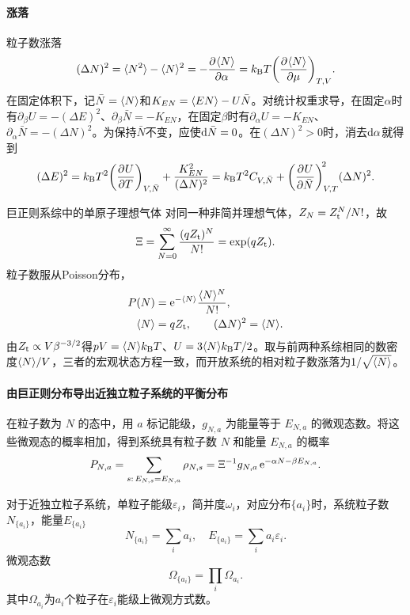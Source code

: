\paragraph{涨落}
粒子数涨落
\begin{align}
	(\Delta N)^2 = \langle N^2\rangle - \langle N\rangle^2 = -\frac{\partial^{}\langle N\rangle}{\partial{\alpha}^{}} = k_{\mathrm{B}} T\biggl(\frac{\partial^{}\langle N\rangle}{\partial{\mu}^{}}\biggr)_{T,V}.
\end{align}
在固定体积下，记$\bar N = \langle N\rangle$和$K_{EN} = \langle EN\rangle - U\bar N$。对统计权重求导，在固定$\alpha$时有$\partial_\beta U = -(\Delta E)^2$、$\partial_\beta\bar N = -K_{EN}$，在固定$\beta$时有$\partial_\alpha U = -K_{EN}$、$\partial_\alpha\bar N = -(\Delta N)^2$。为保持$\bar N$不变，应使$\mathop{}\!\mathrm{d}\bar N = 0$。在$(\Delta N)^2 > 0$时，消去$\mathop{}\!\mathrm{d}\alpha$就得到
\begin{align}
	(\Delta E)^2 = k_{\mathrm{B}} T^2\biggl(\frac{\partial^{}U}{\partial{T}^{}}\biggr)_{V,\bar N}
	+ \frac{K_{EN}^2}{(\Delta N)^2}
	= k_{\mathrm{B}} T^2 C_{V,\bar N} + \biggl(\frac{\partial^{}U}{\partial{\bar N}^{}}\biggr)_{V,T}^{\!2}(\Delta N)^2 .
\end{align}
\begin{example}{巨正则系综中的单原子理想气体}{}
	对同一种非简并理想气体，$Z_N = Z_\mathrm t^N/N!$，故
	\[
		\Xi = \sum_{N=0}^{\infty}\frac{(qZ_\mathrm t)^N}{N!} = \exp(qZ_\mathrm t).
	\]
	粒子数服从Poisson分布，
	\begin{subequations}
		\label{eq:sm-grand-canonical-poisson}
		\begin{align}
			P(N) &= \mathop{}\!\mathrm{e}^{-\langle N\rangle}\frac{\langle N\rangle^N}{N!},\\
			\langle N\rangle &= qZ_\mathrm t,\qquad (\Delta N)^2 = \langle N\rangle.
		\end{align}
	\end{subequations}
	由$Z_\mathrm t \propto V\beta^{-3/2}$得$pV = \langle N\rangle k_{\mathrm{B}} T$、$U = 3\langle N\rangle k_{\mathrm{B}} T/2$。取与前两种系综相同的数密度$\langle N\rangle/V$，三者的宏观状态方程一致，而开放系统的相对粒子数涨落为$1/\sqrt{\langle N\rangle}$。
\end{example}
\paragraph{由巨正则分布导出近独立粒子系统的平衡分布}在粒子数为 $N$ 的态中，用 $a$ 标记能级，$g_{N,a}$ 为能量等于 $E_{N,a}$ 的微观态数。将这些微观态的概率相加，得到系统具有粒子数 $N$ 和能量 $E_{N,a}$ 的概率
\[
	P_{N,a} = \sum_{s:\,E_{N,s}=E_{N,a}}\rho_{N,s} = \Xi^{-1}g_{N,a}\mathop{}\!\mathrm{e}^{-\alpha N-\beta E_{N,a}}.
\]

对于近独立粒子系统，单粒子能级$\varepsilon_i$，简并度$\omega_i$，对应分布$\{a_i\}$时，系统粒子数$N_{\{a_i\}}$，能量$E_{\{a_i\}}$
\[
	N_{\{a_i\}} = \sum_ia_i,\quad E_{\{a_i\}} = \sum_ia_i\varepsilon_i.
\]
微观态数
\[
	\Omega_{\{a_i\}} = \prod_i\Omega_{a_i}.
\]
其中$\Omega_{a_i}$为$a_i$个粒子在$\varepsilon_i$能级上微观方式数。

